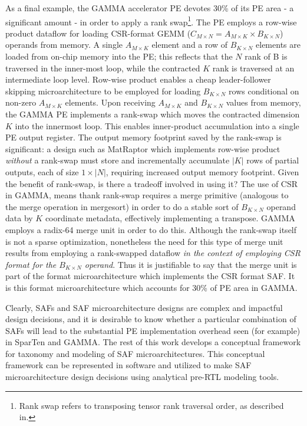 As a final example, the GAMMA\cite{gamma} accelerator PE devotes 30\% of its PE area - a significant amount - in order to apply a rank swap\footnote{Rank swap refers to transposing tensor rank traversal order, as described in\cite{sparse_arch_lecture1}.}. The PE employs a row-wise product dataflow for loading CSR-format GEMM ($C_{M\times N} = A_{M\times K} \times B_{K\times N}$) operands from memory. A single $A_{M\times K}$ element and a row of $B_{K\times N}$ elements are loaded from on-chip memory into the PE; this reflects that the $N$ rank of B is traversed in the inner-most loop, while the contracted $K$ rank is traversed at an intermediate loop level. Row-wise product enables a cheap leader-follower skipping microarchitecture to be employed for loading $B_{K\times N}$ rows conditional on non-zero $A_{M\times K}$ elements. Upon receiving $A_{M\times K}$ and $B_{K\times N}$ values from memory, the GAMMA PE implements a rank-swap which moves the contracted dimension $K$ into the innermost loop. This enables inner-product accumulation into a single PE output register. The output memory footprint saved by the rank-swap is significant: a design such as MatRaptor\cite{matraptor} which implements row-wise product \textit{without} a rank-swap must store and incrementally accumulate $|K|$ rows of partial outputs, each of size $1 \times |N|$, requiring increased output memory footprint. Given the benefit of rank-swap, is there a tradeoff involved in using it? The use of CSR in GAMMA, means thank rank-swap requires a merge primitive (analogous to the merge operation in mergesort) in order to do a stable sort of $B_{K\times N}$ operand data by $K$ coordinate metadata, effectively implementing a transpose. GAMMA employs a radix-64 merge unit\cite{gamma} in order to do this. Although the rank-swap itself is not a sparse optimization, nonetheless the need for this type of merge unit results from employing a rank-swapped dataflow \textit{in the context of employing CSR format for the $B_{K\times N}$ operand}. Thus it is justifiable to say that the merge unit is part of the format microarchitecture which implements the CSR format SAF. It is this format microarchitecture which accounts for 30\% of PE area in GAMMA.

Clearly, SAFs and SAF microarchitecture designs are complex and impactful design decisions, and it is desirable to know whether a particular combination of SAFs will lead to the substantial PE implementation overhead seen (for example) in SparTen and GAMMA. The rest of this work develops a conceptual framework for taxonomy and modeling of SAF microarchitectures. This conceptual framework can be represented in software and utilized to make SAF microarchitecture design decisions using analytical pre-RTL modeling tools.

